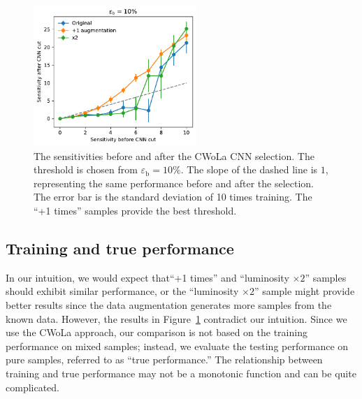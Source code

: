 \documentclass[12pt]{article}
\begin{document}
		\begin{figure}[htpb]
			\centering
			\includegraphics[width=0.55\textwidth]{HVmodel_sensitivity_improvement_bkg_eff_10.pdf}
			\caption{The sensitivities before and after the CWoLa CNN selection. The threshold is chosen from $\varepsilon_{\text{b}} = 10\%$. The slope of the dashed line is $1$, representing the same performance before and after the selection. The error bar is the standard deviation of 10 times training. The ``+1 times'' samples provide the best threshold.}
			\label{fig:sensitivity_improvement_bkg_eff_01}
		\end{figure}
	\subsection{Training and true performance}%
	\label{sub:training_and_true_performance}
		In our intuition, we would expect that``+1 times'' and ``luminosity  $\times 2$'' samples should exhibit similar performance, or the ``luminosity  $\times 2$'' sample might provide better results since the data augmentation generates more samples from the known data. However, the results in Figure~\ref{fig:sensitivity_improvement_bkg_eff_01} contradict our intuition. Since we use the CWoLa approach, our comparison is not based on the training performance on mixed samples; instead, we evaluate the testing performance on pure samples, referred to as ``true performance.'' The relationship between training and true performance may not be a monotonic function and can be quite complicated.
\end{document}
